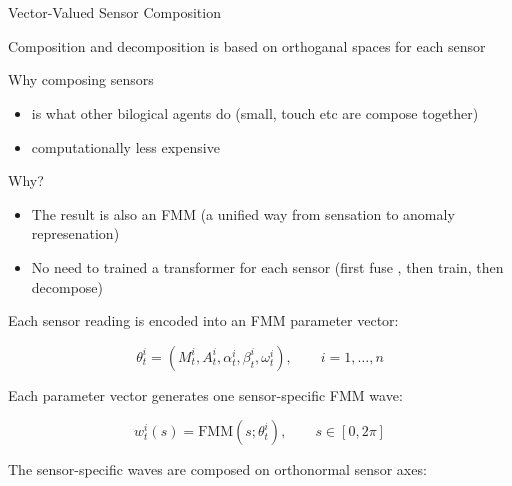 \section{}
    \begin{frame}[allowframebreaks]{Vector-Valued Sensor Composition}
        
        Composition and decomposition is based on orthoganal spaces for each sensor
        \begin{block}{Why composing sensors}
            \begin{itemize}
                \item is what other bilogical agents do (small, touch etc are compose together)
                \item computationally less expensive
            \end{itemize}
        \end{block}
        
        
        \begin{block}{Why?}
            \begin{itemize}
                \item The result is also an FMM (a unified way from sensation to anomaly represenation)
                \item No need to trained a transformer for each sensor (first fuse , then train, then decompose)
            \end{itemize}
            
        \end{block}
        
        \small
        
        Each sensor reading is encoded into an FMM parameter vector:
        
        \begin{equation}
            \theta_t^i
            =
            (M_t^i,A_t^i,\alpha_t^i,\beta_t^i,\omega_t^i),
            \qquad
            i=1,\ldots,n
        \end{equation}
        
        Each parameter vector generates one sensor-specific FMM wave:
        
        \begin{equation}
            w_t^i(s)
            =
            \mathrm{FMM}(s;\theta_t^i),
            \qquad
            s \in [0,2\pi]
        \end{equation}
        
        The sensor-specific waves are composed on orthonormal sensor axes:
        

\end{frame}
